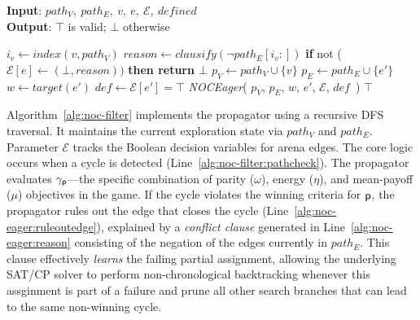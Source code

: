 \documentclass[a4paper,UKenglish,cleveref, autoref, thm-restate, anonymous]{lipics-v2021}
\begin{document}
\begin{algorithm}[htb]
\small
\caption{\textbf{\textit{NOCFilter}}}
\textbf{Input}: $path_V,\ path_E,\ v,\ e,\ \mathcal{E},\ \textit{defined}$ \\
\textbf{Output}: $\top$ is valid; $\bot$ otherwise
\begin{algorithmic}[1]
     \label{alg:noc-filter:pathcheck}
        \STATE $i_v \gets \textit{index}(v, path_V)$
        \IF{$\neg \gamma_{\player}$} \label{alg:noc-filter:condition}
            \STATE $\textit{reason} \gets \textit{clausify}(\neg path_E[i_v:])$ \label{alg:noc-eager:reason}
            \STATE \textbf{if }not ($\mathcal{E}[e] \gets (\bot, \textit{reason}))$ \textbf{then return $\bot$} \label{alg:noc-eager:ruleoutedge}
        \ENDIF
     \label{alg:noc-eager:defcheck}
         \label{alg:no-opponent-cycle-f1:edgecheck}
            \STATE $p_V \gets path_V \cup \{v\}$
            \STATE $p_E \gets path_E \cup \{e'\}$
            \STATE $w \gets \textit{target}(e')$
            \STATE $\textit{def} \gets \mathcal{E}[e'] = \top$
            \STATE \textit{NOCEager}(
                $p_V$,
                $p_E$,
                $w$,
                $e'$,
                $\mathcal{E}$,
                $\textit{def}$\ )
        \ENDFOR
    \ENDIF
    \RETURN $\top$
\end{algorithmic}
\label{alg:noc-filter}
\end{algorithm}

Algorithm~\ref{alg:noc-filter} implements the \noc propagator using a recursive DFS traversal. It maintains the current exploration state via $path_V$ and $path_E$. Parameter $\mathcal{E}$ tracks the Boolean decision variables for arena edges. The core logic occurs when a cycle is detected (Line~\ref{alg:noc-filter:pathcheck}). The propagator evaluates $\gamma_{\mathsf{p}}$---the specific combination of parity ($\omega$), energy ($\eta$), and mean-payoff ($\mu$) objectives in the game. 
%
If the cycle violates the winning criteria for $\mathsf{p}$, the propagator rules out the edge that closes the cycle (Line~\ref{alg:noc-eager:ruleoutedge}), explained by a \textit{conflict clause} generated in Line~\ref{alg:noc-eager:reason} consisting of the negation of the edges currently in $path_E$. This clause effectively {\em learns} the failing partial assignment, allowing the underlying SAT/CP solver to perform non-chronological backtracking whenever this assginment is part of a failure and prune all other search branches that can lead to the same non-winning cycle.
\end{document}
